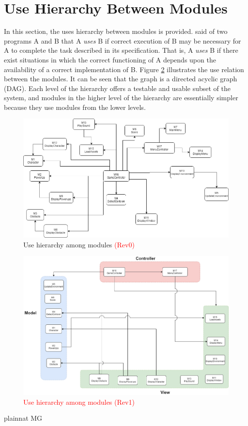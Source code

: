 \documentclass[12pt, titlepage]{article}
\begin{document}
\section{Use Hierarchy Between Modules} \label{SecUse}

In this section, the uses hierarchy between modules is
provided. \citet{Parnas1978} said of two programs A and B that A {\em uses} B if
correct execution of B may be necessary for A to complete the task described in
its specification. That is, A {\em uses} B if there exist situations in which
the correct functioning of A depends upon the availability of a correct
implementation of B.  Figure \ref{FigUH} illustrates the use relation between
the modules. It can be seen that the graph is a directed acyclic graph
(DAG). Each level of the hierarchy offers a testable and usable subset of the
system, and modules in the higher level of the hierarchy are essentially simpler
because they use modules from the lower levels.

\begin{figure}[H]
\centering
\includegraphics[width=1\textwidth]{Module Hiearchy.png}
\caption{Use hierarchy among modules \textcolor{red}{(Rev0)}}
\label{FigUH}
\end{figure}
\begin{figure}[H]
\centering
\includegraphics[width=1\textwidth]{Module Hiearchy_Rev1.png}
\caption{\textcolor{red}{Use hierarchy among modules (Rev1) }}
\label{FigUH}
\end{figure}


 {plainnat}
 {MG}
\end{document}
